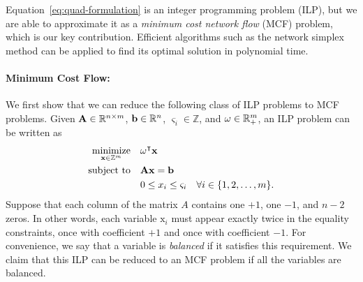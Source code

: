 Equation~\eqref{eq:quad-formulation} is an integer programming problem (ILP), but we are able to approximate it as a \emph{minimum cost network flow} (MCF) problem, which is our key contribution. Efficient algorithms such as the network simplex method \cite{orlin1997polynomial} can be applied to find its optimal solution in polynomial time.

\paragraph*{Minimum Cost Flow:}
\label{sec:mincost}


We first show that we can reduce the following class of ILP problems to MCF problems. Given $\mathbf{A} \in \mathbb{R}^{n \times m}$, $\mathbf{b} \in \mathbb{R}^{n}$, $\varsigma_i \in \mathbb{Z}$, and $\mathbf{\omega} \in \mathbb{R}^{m}_+$, an ILP problem can be written as
\begin{equation}
\begin{split}
\operatorname*{minimize}_{\mathbf{x} \in \mathbb{Z}^m} \quad & \mathbf{\omega}^\intercal \mathbf{x} \\
\text{subject to} \quad & \mathbf{Ax} = \mathbf{b} \\
& 0 \le x_i \le \varsigma_i \quad \forall i \in \{1, 2, \dots, m\}.
\end{split}
\label{eq:quad-ilp}
\end{equation}
Suppose that each column of the matrix $A$ contains one $+1$, one $-1$, and $n-2$ zeros. In other words, each variable $\mathrm{x}_i$ must appear exactly twice in the equality constraints, once with coefficient $+1$ and once with coefficient $-1$. For convenience, we say that a variable is \emph{balanced} if it satisfies this requirement. We claim that this ILP can be reduced to an MCF problem if all the variables are balanced.  

